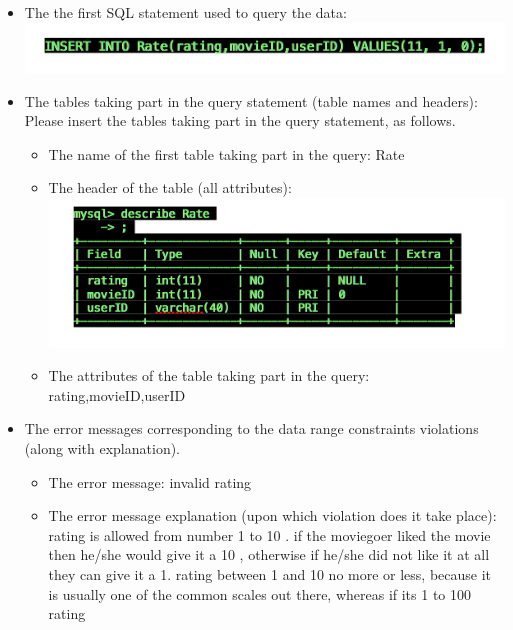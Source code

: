 {\begin{itemize}
\begin{itemize}
	\item{The error message: }
	invalid age
	\item{The error message explanation (upon which violation does it take place): }
	1 to 100 is accepted because a person who normally goes to movies can be between 1 and 100
	\item{The error message example according to user(s) scenario(s): }
	When a user types in their age when they are filling out their information we need, and they accidentally type 555 instead of 55 , the error message will pop up.
	 \end{itemize}
\item{The the first SQL statement used to query the data: }
	\includegraphics[scale=0.3]{ICC.png}
\item{The tables taking part in the query statement (table names and headers): }
	Please insert the tables taking part in the query statement, as follows.
	 \begin{itemize} 
	 \item{The name of the first table taking part in the query: }
	 Rate
	  \item{The header of the table  (all attributes): }
	\includegraphics[scale=0.3]{rate.png}
	  \item{The attributes of the table taking part in the query: }
	  rating,movieID,userID
	  \end{itemize}
\item{}
	The error messages corresponding to the data range constraints violations (along with explanation).
	\begin{itemize} 
	\item{The error message: }
	invalid rating
	\item{The error message explanation (upon which violation does it take place): }
	rating is allowed from number 1 to 10 . if the moviegoer liked the movie then he/she would give it a 10 , otherwise if he/she did not like it at all they can give it a 1. rating between 1 and 10 no more or less, because it is usually one of the common scales out there, whereas if its 1 to 100 rating 

\end{itemize}
\end{itemize}}
